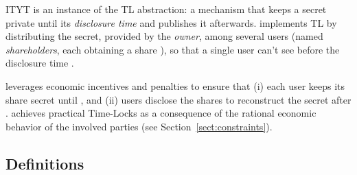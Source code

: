 %
%






ITYT is an instance of the TL abstraction: a mechanism that keeps a secret \secret private until its {\em disclosure time} \td and publishes it afterwards.
%
\shortname implements TL by distributing the secret, provided by the {\em owner}, among several users (named {\em shareholders}, each obtaining a share \share), so that a single user can't see  \secret before the disclosure time \td.

\shortname leverages economic incentives and penalties to ensure that (i) each user keeps its share secret until \td, and (ii) users disclose the shares to reconstruct the secret after \td.
%
%
%
\shortname achieves practical Time-Locks as a consequence of the rational economic behavior of the involved parties
(see Section~\ref{sect:constraints}).

\subsection{Definitions}

